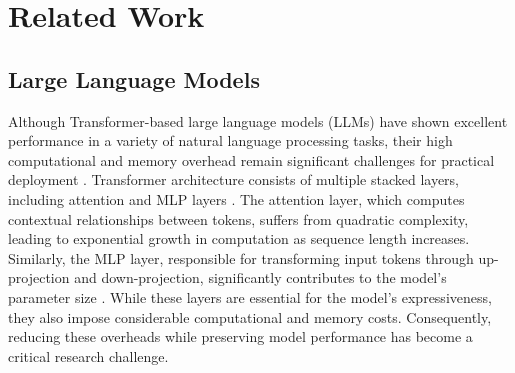 \section{Related Work}
\subsection{Large Language Models}
Although Transformer-based large language models (LLMs) have shown excellent performance in a variety of natural language processing tasks, their high computational and memory overhead remain significant challenges for practical deployment \cite{sun2023simple,lin2024awq}. Transformer architecture consists of multiple stacked layers, including attention and MLP layers \cite{vaswani2017attention}. The attention layer, which computes contextual relationships between tokens, suffers from quadratic complexity, leading to exponential growth in computation as sequence length increases. Similarly, the MLP layer, responsible for transforming input tokens through up-projection and down-projection, significantly contributes to the model's parameter size \cite{zeng2024kan}. While these layers are essential for the model's expressiveness, they also impose considerable computational and memory costs. Consequently, reducing these overheads while preserving model performance has become a critical research challenge.



